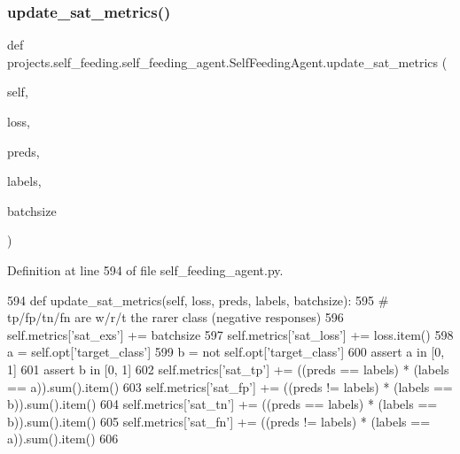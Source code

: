 \subsubsection{\texorpdfstring{update\+\_\+sat\+\_\+metrics()}{update\_sat\_metrics()}}
{\footnotesize\ttfamily def projects.\+self\+\_\+feeding.\+self\+\_\+feeding\+\_\+agent.\+Self\+Feeding\+Agent.\+update\+\_\+sat\+\_\+metrics (\begin{DoxyParamCaption}\item[{}]{self,  }\item[{}]{loss,  }\item[{}]{preds,  }\item[{}]{labels,  }\item[{}]{batchsize }\end{DoxyParamCaption})}



Definition at line 594 of file self\+\_\+feeding\+\_\+agent.\+py.


\begin{DoxyCode}
594     \textcolor{keyword}{def }update\_sat\_metrics(self, loss, preds, labels, batchsize):
595         \textcolor{comment}{# tp/fp/tn/fn are w/r/t the rarer class (negative responses)}
596         self.metrics[\textcolor{stringliteral}{'sat\_exs'}] += batchsize
597         self.metrics[\textcolor{stringliteral}{'sat\_loss'}] += loss.item()
598         a = self.opt[\textcolor{stringliteral}{'target\_class'}]
599         b = \textcolor{keywordflow}{not} self.opt[\textcolor{stringliteral}{'target\_class'}]
600         \textcolor{keyword}{assert} a \textcolor{keywordflow}{in} [0, 1]
601         \textcolor{keyword}{assert} b \textcolor{keywordflow}{in} [0, 1]
602         self.metrics[\textcolor{stringliteral}{'sat\_tp'}] += ((preds == labels) * (labels == a)).sum().item()
603         self.metrics[\textcolor{stringliteral}{'sat\_fp'}] += ((preds != labels) * (labels == b)).sum().item()
604         self.metrics[\textcolor{stringliteral}{'sat\_tn'}] += ((preds == labels) * (labels == b)).sum().item()
605         self.metrics[\textcolor{stringliteral}{'sat\_fn'}] += ((preds != labels) * (labels == a)).sum().item()
606 
\end{DoxyCode}
\mbox{\label{classprojects_1_1self__feeding_1_1self__feeding__agent_1_1SelfFeedingAgent_a89a2bb3f299fe29c018ea39af72446c6}} 
